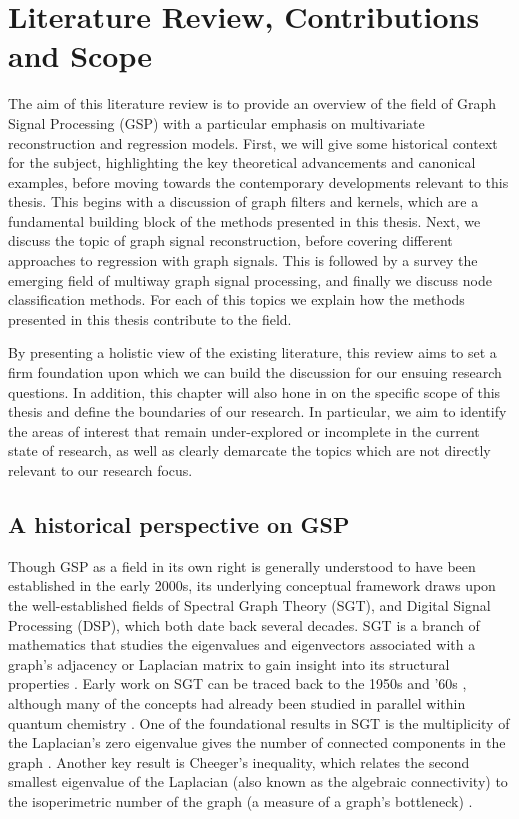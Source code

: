 \chapter{Literature Review, Contributions and Scope} 

\label{chap:lit_review} 


The aim of this literature review is to provide an overview of the field of Graph Signal Processing (GSP) with a particular emphasis on multivariate reconstruction and regression models. First, we will give some historical context for the subject, highlighting the key theoretical advancements and canonical examples, before moving towards the contemporary developments relevant to this thesis. This begins with a discussion of graph filters and kernels, which are a fundamental building block of the methods presented in this thesis. Next, we discuss the topic of graph signal reconstruction, before covering different approaches to regression with graph signals. This is followed by a survey the emerging field of multiway graph signal processing, and finally we discuss node classification methods. For each of this topics we explain how the methods presented in this thesis contribute to the field. 

By presenting a holistic view of the existing literature, this review aims to set a firm foundation upon which we can build the discussion for our ensuing research questions. In addition, this chapter will also hone in on the specific scope of this thesis and define the boundaries of our research. In particular, we aim to identify the areas of interest that remain under-explored or incomplete in the current state of research, as well as clearly demarcate the topics which are not directly relevant to our research focus. 


\section{A historical perspective on GSP}

Though GSP as a field in its own right is generally understood to have been established in the early 2000s, its underlying conceptual framework draws upon the well-established fields of Spectral Graph Theory (SGT), and Digital Signal Processing (DSP), which both date back several decades. SGT is a branch of mathematics that studies the eigenvalues and eigenvectors associated with a graph's adjacency or Laplacian matrix to gain insight into its structural properties \citep{Chung1997}. Early work on SGT can be traced back to the 1950s and '60s \citep{Collatz1957,Hoffman1969}, although many of the concepts had already been studied in parallel within quantum chemistry \citep{Huckel1931}. One of the foundational results in SGT is the multiplicity of the Laplacian's zero eigenvalue gives the number of connected components in the graph \citep{Cvetkovic1980}. Another key result is Cheeger's inequality, which relates the second smallest eigenvalue of the Laplacian (also known as the algebraic connectivity) to the isoperimetric number of the graph (a measure of a graph's bottleneck) \citep{Cheeger1971}. 


